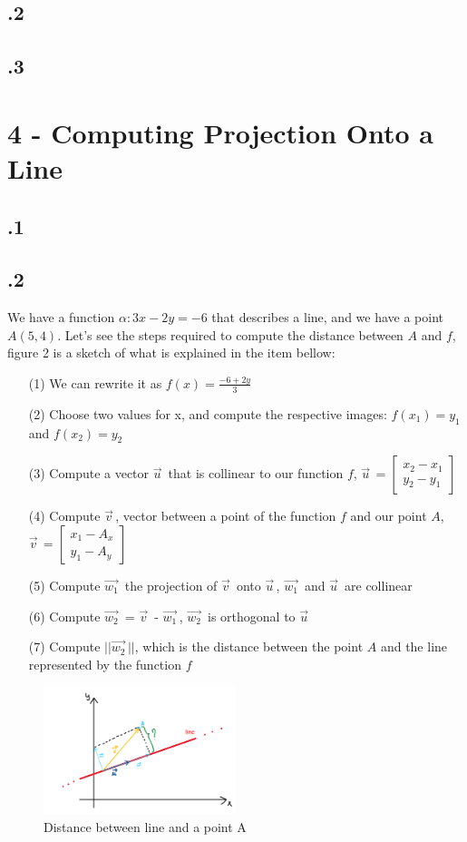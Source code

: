 \documentclass[a4paper]{article}
\begin{document}
\subsection*{.2}
\subsection*{.3}

\section*{4 - Computing Projection Onto a Line}
\subsection*{.1}
\subsection*{.2}
We have a function $\alpha : 3x - 2y = -6$ that describes a line, and we have a point $A(5, 4)$. Let's see the steps required to compute the distance between $A$ and $f$, figure 2 is a sketch of what is explained in the item bellow:
\begin{itemize}
\item[(1)] We can rewrite it as $f(x) = \frac{-6 +2y}{3}$
\item[(2)] Choose two values for x, and compute the respective images: $f(x_{1}) = y_{1}$ and $f(x_{2}) = y_{2}$
\item[(3)] Compute a vector $\vec{u}^{\,}$ that is collinear to our function $f$, $\vec{u}^{\,} = \begin{bmatrix} x_{2} - x_{1}\\y_{2} - y_{1} \end{bmatrix}$
\item[(4)] Compute $\vec{v}^{\,}$, vector between a point of the function $f$ and our point $A$, $\vec{v}^{\,} = \begin{bmatrix} x_{1} - A_{x}\\y_{1} - A_{y} \end{bmatrix}$
\item[(5)] Compute $\vec{w_{1}}^{\,}$ the projection of $\vec{v}^{\,}$ onto $\vec{u}^{\,}$, $\vec{w_{1}}^{\,}$ and $\vec{u}^{\,}$ are collinear
\item[(6)] Compute $\vec{w_{2}}^{\,}$ = $\vec{v}^{\,}$ - $\vec{w_{1}}^{\,}$, $\vec{w_{2}}^{\,}$ is orthogonal to $\vec{u}^{\,}$
\item[(7)] Compute $||\vec{w_{2}}^{\,}||$, which is the distance between the point $A$ and the line represented by the function $f$
\end{itemize}

\begin{figure}[H]
\center
\includegraphics[width=0.5\textwidth]{images/projection_exo_4.PNG}
\caption{Distance between line and a point A}
\end{figure}
\end{document}
